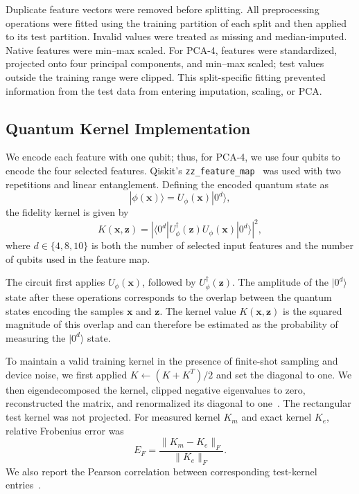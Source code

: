 \documentclass[letterpaper]{article} %
\begin{document}
Duplicate feature vectors were removed before splitting. All preprocessing operations were fitted using the training partition of each split and then applied to its test partition. Invalid values were treated as missing and median-imputed. Native features were min--max scaled. For PCA-4, features were standardized, projected onto four principal components, and min--max scaled; test values outside the training range were clipped. This split-specific fitting prevented information from the test data from entering imputation, scaling, or PCA.

\subsection{Quantum Kernel Implementation}

We encode each feature with one qubit; thus, for PCA-4, we use four qubits to encode the four selected features. Qiskit's \texttt{zz\_feature\_map}~\cite{qiskit2024} was used with two repetitions and linear entanglement. Defining the encoded quantum state as
\[
|\phi(\mathbf{x})\rangle = U_{\phi}(\mathbf{x})|0^d\rangle,
\]
the fidelity kernel is given by
\begin{equation}
K(\mathbf{x},\mathbf{z})
=
\left|
\langle 0^d|
U_{\phi}^{\dagger}(\mathbf{z})
U_{\phi}(\mathbf{x})
|0^d\rangle
\right|^2,
\label{eq:fidelity-kernel}
\end{equation}
where $d \in \{4,8,10\}$ is both the number of selected input features and the number of qubits used in the feature map.

The circuit first applies $U_{\phi}(\mathbf{x})$, followed by $U_{\phi}^{\dagger}(\mathbf{z})$. The amplitude of the $|0^d\rangle$ state after these operations corresponds to the overlap between the quantum states encoding the samples $\mathbf{x}$ and $\mathbf{z}$. The kernel value $K(\mathbf{x},\mathbf{z})$ is the squared magnitude of this overlap and can therefore be estimated as the probability of measuring the $|0^d\rangle$ state.

To maintain a valid training kernel in the presence of finite-shot sampling and device noise, we first applied $K\leftarrow(K+K^T)/2$ and set the diagonal to one. We then eigendecomposed the kernel, clipped negative eigenvalues to zero, reconstructed the matrix, and renormalized its diagonal to one~\cite{scholkopf2002,qiskit2024}. The rectangular test kernel was not projected. For measured kernel $K_m$ and exact kernel $K_e$, relative Frobenius error was
\begin{equation}
E_F=\frac{\lVert K_m-K_e\rVert_F}{\lVert K_e\rVert_F}.
\label{eq:frobenius-error}
\end{equation}
We also report the Pearson correlation between corresponding test-kernel entries~\cite{Frob,Pear}.
\end{document}
